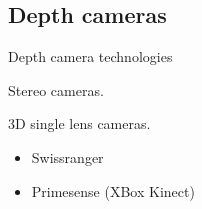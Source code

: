 \documentclass[compress]{beamer}
\begin{document}
\subsection{Depth cameras}

\begin{frame}{Depth camera technologies}

Stereo cameras.

3D single lens cameras.

\begin{itemize}

\item
  Swissranger
\item
  Primesense (XBox Kinect)
\end{itemize}

\end{frame}
\end{document}
